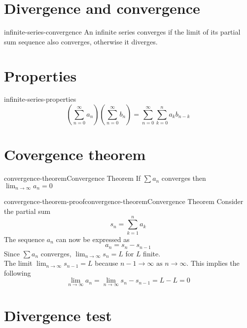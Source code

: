 \documentclass[preview]{standalone}
\begin{document}
\genpage

\section{Divergence and convergence}

\begin{snippet}{infinite-series-convergence}
An infinite series converges if the limit
of its partial sum sequence also converges,
otherwise it diverges.
\end{snippet}

\section{Properties}

\begin{snippettheorem}{infinite-series-properties}{}
    \[
        \left(
            \sum_{n=0}^\infty a_n
        \right)
        \left(
            \sum_{n=0}^\infty b_n
        \right)
        =
        \sum_{n=0}^\infty \sum_{k=0}^n a_k b_{n-k}
    \]
\end{snippettheorem}

\section{Covergence theorem}

\begin{snippettheorem}{convergence-theorem}{Convergence Theorem}
    If \(\sum a_n\) converges then \(\lim_{n\to\infty}a_n=0\)
\end{snippettheorem}

\begin{snippetproof}{convergence-theorem-proof}{convergence-theorem}{Convergence Theorem}
    Consider the partial sum
    \[
        s_n = \sum_{k=1}^{n}a_k
    \]
    The sequence \(a_n\) can now be expressed as
    \[
        a_n = s_n - s_{n-1}
    \]
    Since \(\sum a_n\) converges, \(\lim_{n\to\infty}s_n=L\) for \(L\) finite. \\
    The limit \(\lim_{n\to\infty}s_{n-1}=L\) because \(n-1 \to \infty \text{ as } n \to \infty\).
    This implies the following
    \[
        \lim_{n \to \infty} a_n
        = \lim_{n \to \infty} s_n - s_{n-1} = L - L = 0
    \]
\end{snippetproof}

\section{Divergence test}
\end{document}
